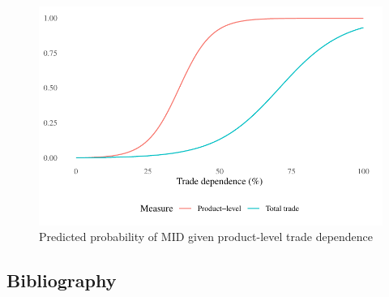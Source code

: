 \documentclass[
  letterpaper,
]{article}
\begin{document}
\begin{figure}

{\centering \includegraphics{article_files/figure-pdf/unnamed-chunk-4-1.pdf}

}

\caption{Predicted probability of MID given product-level trade
dependence}

\end{figure}

\newpage{}

\hypertarget{bibliography}{%
\subsection*{Bibliography}\label{bibliography}}
\end{document}
